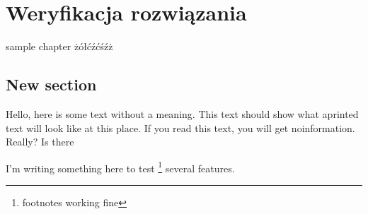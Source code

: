 \chapter{Weryfikacja rozwiązania}

sample chapter żółćźćśźż

\section{New section}
 
Hello, here is some text without a meaning.  This text should 
show what aprinted text will look like at this place.  If you 
read this text, you will get noinformation.  Really?  Is there 

I'm writing something here to test \footnote{footnotes working fine}
several features. 